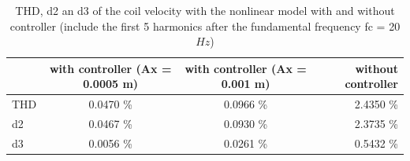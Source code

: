 \begin{table}[H]
 \centering 
\begin{tabular}{|l|c|c|r|}
  \hline
   & with controller (Ax = 0.0005 m) & with controller (Ax = 0.001 m) & without controller \\
  \hline
  THD & 0.0470 \% & 0.0966 \% & 2.4350 \%\\
	\hline
  d2 & 0.0467 \%& 0.0930 \% & 2.3735 \%\\
	\hline
	d3 & 0.0056 \%& 0.0261 \% & 0.5432 \%\\
  \hline
\end{tabular}
\caption{THD, d2 an d3 of the coil velocity with the nonlinear model with and without controller (include the first 5 harmonics after the fundamental frequency fc = 20 $Hz$)}
	\label{tabTHD}
	\end{table}